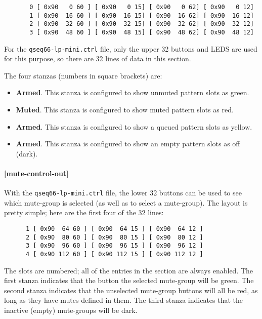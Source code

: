    \begin{verbatim}
       0 [ 0x90   0 60 ] [ 0x90   0 15] [ 0x90   0 62] [ 0x90   0 12]
       1 [ 0x90  16 60 ] [ 0x90  16 15] [ 0x90  16 62] [ 0x90  16 12]
       2 [ 0x90  32 60 ] [ 0x90  32 15] [ 0x90  32 62] [ 0x90  32 12]
       3 [ 0x90  48 60 ] [ 0x90  48 15] [ 0x90  48 62] [ 0x90  48 12]
   \end{verbatim}

   For the \texttt{qseq66-lp-mini.ctrl} file, only the upper 32 buttons and
   LEDS are used for this purpose, so there are 32 lines of data in this
   section.

   The four stanzas (numbers in square brackets) are:

   \begin{itemize}
      \item \textbf{Armed}.  This stanza is configured to show unmuted pattern
         slots as green.
      \item \textbf{Muted}.  This stanza is configured to show muted pattern
         slots as red.
      \item \textbf{Armed}.  This stanza is configured to show a queued pattern
         slots as yellow.
      \item \textbf{Armed}.  This stanza is configured to show an empty pattern
         slots as off (dark).
   \end{itemize}

\paragraph{[mute-control-out]}
\label{paragraph:patterns_mute_control_out}

   With the \texttt{qseq66-lp-mini.ctrl} file, the lower 32 buttons can be used
   to see which mute-group is selected (as well as to select a mute-group).
   The layout is pretty simple; here are the first four of the 32 lines:

   \begin{verbatim}
      1 [ 0x90  64 60 ] [ 0x90  64 15 ] [ 0x90  64 12 ]
      2 [ 0x90  80 60 ] [ 0x90  80 15 ] [ 0x90  80 12 ]
      3 [ 0x90  96 60 ] [ 0x90  96 15 ] [ 0x90  96 12 ]
      4 [ 0x90 112 60 ] [ 0x90 112 15 ] [ 0x90 112 12 ]
   \end{verbatim}

   The slots are numbered; all of the entries in the section are always
   enabled.  The first stanza indicates that the button the selected mute-group
   will be green.  The second stanza indicates that the unselected mute-group
   buttons will all be red, as long as they have mutes defined in them.  The
   third stanza indicates that the inactive (empty) mute-groups will be dark.

